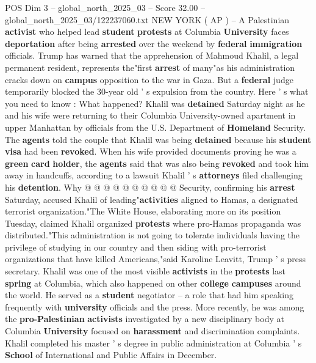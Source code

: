 \begin{textsample}{POS Dim 3 – global\_north\_2025\_03 – Score 32.00 – global\_north\_2025\_03/122237060.txt}  \label{ex:f3_pos_030}
NEW YORK ( AP ) -- A Palestinian \textbf{activist} who helped lead \textbf{student} \textbf{protests} at Columbia \textbf{University} faces \textbf{deportation} after being \textbf{arrested} over the weekend by \textbf{federal} \textbf{immigration} officials.
Trump has warned that the apprehension of Mahmoud Khalil, a legal permanent resident, represents the"first \textbf{arrest} of many"as his administration cracks down on \textbf{campus} opposition to the war in Gaza.
But a \textbf{federal} judge temporarily blocked the 30-year old ' s expulsion from the country.
Here ' s what you need to know : What happened?
Khalil was \textbf{detained} Saturday night as he and his wife were returning to their Columbia University-owned apartment in upper Manhattan by officials from the U.S.
Department of \textbf{Homeland} Security.
The \textbf{agents} told the couple that Khalil was being \textbf{detained} because his \textbf{student} \textbf{visa} had been \textbf{revoked}.
When his wife provided documents proving he was a \textbf{green} \textbf{card} \textbf{holder}, the \textbf{agents} said that was also being \textbf{revoked} and took him away in handcuffs, according to a lawsuit Khalil ' s \textbf{attorneys} filed challenging his \textbf{detention}.
Why @ @ @ @ @ @ @ @ @ @ Security, confirming his \textbf{arrest} Saturday, accused Khalil of leading"\textbf{activities} aligned to Hamas, a designated terrorist organization."The White House, elaborating more on its position Tuesday, claimed Khalil organized \textbf{protests} where pro-Hamas propaganda was distributed."This administration is not going to tolerate individuals having the privilege of studying in our country and then siding with pro-terrorist organizations that have killed Americans,"said Karoline Leavitt, Trump ' s press secretary.
Khalil was one of the most visible \textbf{activists} in the \textbf{protests} last \textbf{spring} at Columbia, which also happened on other \textbf{college} \textbf{campuses} around the world.
He served as a \textbf{student} negotiator -- a role that had him speaking frequently with \textbf{university} officials and the press.
More recently, he was among the \textbf{pro-Palestinian} \textbf{activists} investigated by a new disciplinary body at Columbia \textbf{University} focused on \textbf{harassment} and discrimination complaints.
Khalil completed his master ' s degree in public administration at Columbia ' s \textbf{School} of International and Public Affairs in December.

\end{textsample}
